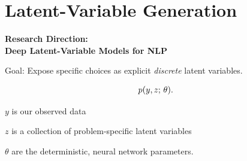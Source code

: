 \documentclass[aspectratio=169]{beamer}
\let\tempone\itemize
\let\temptwo\enditemize
\renewenvironment{itemize}{\tempone\addtolength{\itemsep}{0.5\baselineskip}}{\temptwo}
\begin{document}
\section{Latent-Variable Generation}

\begin{frame}
\begin{center}
    \textbf{Research Direction: \\
      Deep Latent-Variable Models for NLP }
  \end{center}
  Goal: Expose specific choices as explicit \textit{discrete} latent variables.


\begin{align*}
p(y, z ; \, \theta).
\end{align*}

\pause
\begin{itemize}
    \item $y$ is our observed data
    \item $z$ is a collection of problem-specific latent variables
    \item $\theta$ are the deterministic, neural network parameters.
\end{itemize}



\end{frame}
\end{document}
